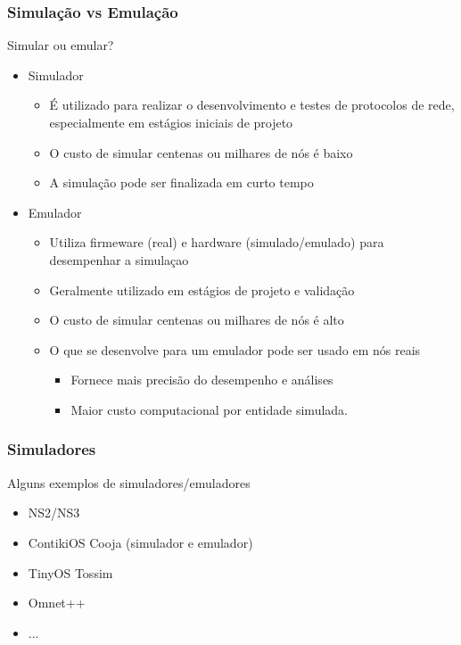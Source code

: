 \documentclass{beamer}
\begin{document}
\begin{frame}\frametitle{Simulação vs Emulação}

\begin{block}{Simular ou emular?}
	\begin{itemize}
		
		\item Simulador
		\begin{itemize}
			\item É utilizado para realizar o desenvolvimento e testes de protocolos de rede, especialmente em estágios iniciais de projeto
			\item O custo de simular centenas ou milhares de nós é baixo
			\item A simulação pode ser finalizada em curto tempo
		\end{itemize}

		\item Emulador

		\begin{itemize}
			\item Utiliza firmeware (real) e hardware (simulado/emulado) para desempenhar a simulaçao
			\item Geralmente utilizado em estágios de projeto e validação
			\item O custo de simular centenas ou milhares de nós é alto
			\item O que se desenvolve para um emulador pode ser usado em nós reais
				\begin{itemize}
					\item Fornece mais precisão do desempenho e análises
					\item Maior custo computacional por entidade simulada.
				\end{itemize}
		\end{itemize}

	\end{itemize}
\end{block}

\end{frame}


\begin{frame}\frametitle{Simuladores}

\begin{block}{Alguns exemplos de simuladores/emuladores}
\begin{itemize}
	\item NS2/NS3
	\item ContikiOS Cooja (simulador e emulador)
	\item TinyOS Tossim
	\item Omnet++
	\item ...
\end{itemize}
\end{block}

\end{frame}

\end{document}
